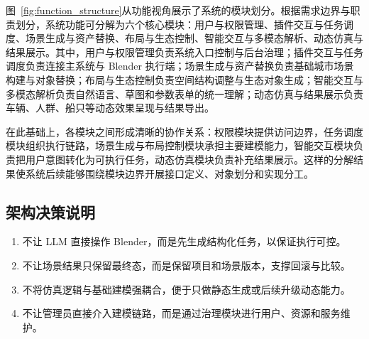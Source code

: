 图~\ref{fig:function_structure}从功能视角展示了系统的模块划分。根据需求边界与职责划分，系统功能可分解为六个核心模块：用户与权限管理、插件交互与任务调度、场景生成与资产替换、布局与生态控制、智能交互与多模态解析、动态仿真与结果展示。其中，用户与权限管理负责系统入口控制与后台治理；插件交互与任务调度负责连接主系统与 Blender 执行端；场景生成与资产替换负责基础城市场景构建与对象替换；布局与生态控制负责空间结构调整与生态对象生成；智能交互与多模态解析负责自然语言、草图和参数表单的统一理解；动态仿真与结果展示负责车辆、人群、船只等动态效果呈现与结果导出。

在此基础上，各模块之间形成清晰的协作关系：权限模块提供访问边界，任务调度模块组织执行链路，场景生成与布局控制模块承担主要建模能力，智能交互模块负责把用户意图转化为可执行任务，动态仿真模块负责补充结果展示。这样的分解结果使系统后续能够围绕模块边界开展接口定义、对象划分和实现分工。

\subsection{架构决策说明}
\begin{enumerate}[label=\arabic*.]
    \item 不让 LLM 直接操作 Blender，而是先生成结构化任务，以保证执行可控。
    \item 不让场景结果只保留最终态，而是保留项目和场景版本，支撑回滚与比较。
    \item 不将仿真逻辑与基础建模强耦合，便于只做静态生成或后续升级动态能力。
    \item 不让管理员直接介入建模链路，而是通过治理模块进行用户、资源和服务维护。
\end{enumerate}
